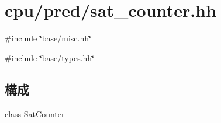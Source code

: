 \hypertarget{sat__counter_8hh}{
\section{cpu/pred/sat\_\-counter.hh}
\label{sat__counter_8hh}
}
{\ttfamily \#include \char`\"{}base/misc.hh\char`\"{}}\par
{\ttfamily \#include \char`\"{}base/types.hh\char`\"{}}\par
\subsection*{構成}
\begin{DoxyCompactItemize}
\item 
class \hyperlink{classSatCounter}{SatCounter}
\end{DoxyCompactItemize}
